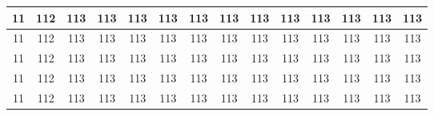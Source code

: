 \begin{landscape}
\begin{table}[H]
{\begin{tabular}{|c|c|c|c|c|c|c|c|c|c|c|c|c|c|}
            \hline
            11                  & 112                        & 113                                              & 113                                              & 113                                              & 113                                              & 113                                              & 113                                              & 113                & 113                & 113                & 113                & 113                & 113                \\
            \hline
            11                  & 112                        & 113                                              & 113                                              & 113                                              & 113                                              & 113                                              & 113                                              & 113                & 113                & 113                & 113                & 113                & 113                \\
            \hline
            11                  & 112                        & 113                                              & 113                                              & 113                                              & 113                                              & 113                                              & 113                                              & 113                & 113                & 113                & 113                & 113                & 113                \\
            \hline
            11                  & 112                        & 113                                              & 113                                              & 113                                              & 113                                              & 113                                              & 113                                              & 113                & 113                & 113                & 113                & 113                & 113                \\
            \hline
            11                  & 112                        & 113                                              & 113                                              & 113                                              & 113                                              & 113                                              & 113                                              & 113                & 113                & 113                & 113                & 113                & 113                \\

\end{tabular}}
\end{table}
\end{landscape}
